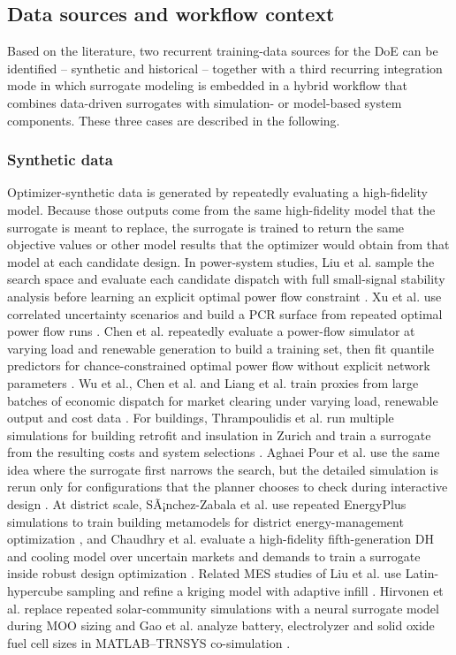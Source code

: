 \documentclass[final,5p,times,twocolumn]{elsarticle}
\begin{document}
\subsection{Data sources and workflow context}
\label{sec:doe:sources}

Based on the literature, two recurrent training-data sources for the
DoE can be identified -- synthetic and historical -- together with a
third recurring integration mode in which surrogate modeling is embedded
in a hybrid workflow that combines data-driven surrogates with
simulation- or model-based system components. These three cases are
described in the following.

\subsubsection{Synthetic data}

Optimizer-synthetic data is generated by repeatedly evaluating a
high-fidelity model. Because those outputs come from the same
high-fidelity model that the surrogate is meant to replace, the
surrogate is trained to return the same objective values or other model
results that the optimizer would obtain from that model at each
candidate design. In power-system studies, Liu et al. sample the search
space and evaluate each candidate dispatch with full small-signal
stability analysis before learning an explicit optimal power flow
constraint \cite{Liu20223726}. Xu et al. use correlated uncertainty
scenarios and build a PCR surface from repeated optimal power flow runs
\cite{Xu20212696}. Chen et al. repeatedly evaluate a power-flow simulator at
varying load and renewable generation to build a training set, then fit
quantile predictors for chance-constrained optimal power flow without
explicit network parameters \cite{Chen2023657}. Wu et al., Chen et al. and
Liang et al. train proxies from large batches of economic dispatch for
market clearing under varying load, renewable output and cost data
\cite{Wu2022231,Chen2022,Liang20246508}. For buildings, Thrampoulidis et
al. run multiple simulations for building retrofit and insulation in
Zurich and train a surrogate from the resulting costs and system
selections \cite{Thrampoulidis2021}. Aghaei Pour et al. use the same idea
where the surrogate first narrows the search, but the detailed
simulation is rerun only for configurations that the planner chooses to
check during interactive design \cite{Aghaei Pour2022303}. At district
scale, SÃ¡nchez-Zabala et al. use repeated EnergyPlus simulations to
train building metamodels for district energy-management optimization
\cite{Sánchez-Zabala2024}, and Chaudhry et al.
evaluate a high-fidelity fifth-generation DH and cooling model over
uncertain markets and demands to train a surrogate inside robust design
optimization \cite{Chaudhry2024}. Related MES studies of Liu et al. use
Latin-hypercube sampling and refine a kriging model with adaptive infill
\cite{Liu201914569}. Hirvonen et al. replace repeated solar-community
simulations with a neural surrogate model during MOO sizing
\cite{Hirvonen2017323} and Gao et al. analyze battery, electrolyzer and
solid oxide fuel cell sizes in MATLAB--TRNSYS co-simulation \cite{Gao2025}.
\end{document}

